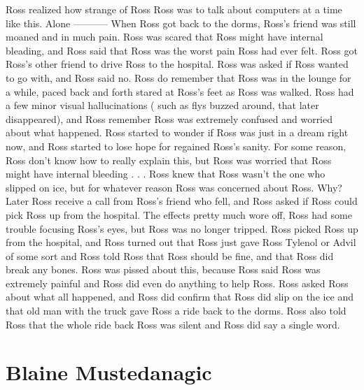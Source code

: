 \documentclass[12pt]{book}
\begin{document}
Ross realized how strange of Ross Ross was to talk about computers at a time like this. Alone ----------- When Ross got back to the dorms, Ross's friend was still moaned and in much pain. Ross was scared that Ross might have internal bleading, and Ross said that Ross was the worst pain Ross had ever felt. Ross got Ross's other friend to drive Ross to the hospital. Ross was asked if Ross wanted to go with, and Ross said no. Ross do remember that Ross was in the lounge for a while, paced back and forth stared at Ross's feet as Ross was walked. Ross had a few minor visual hallucinations ( such as flys buzzed around, that later disappeared), and Ross remember Ross was extremely confused and worried about what happened. Ross started to wonder if Ross was just in a dream right now, and Ross started to lose hope for regained Ross's sanity. For some reason, Ross don't know how to really explain this, but Ross was worried that Ross might have internal bleeding . . .  Ross knew that Ross wasn't the one who slipped on ice, but for whatever reason Ross was concerned about Ross. Why? Later Ross receive a call from Ross's friend who fell, and Ross asked if Ross could pick Ross up from the hospital. The effects pretty much wore off, Ross had some trouble focusing Ross's eyes, but Ross was no longer tripped. Ross picked Ross up from the hospital, and Ross turned out that Ross just gave Ross Tylenol or Advil of some sort and Ross told Ross that Ross should be fine, and that Ross did break any bones. Ross was pissed about this, because Ross said Ross was extremely painful and Ross did even do anything to help Ross. Ross asked Ross about what all happened, and Ross did confirm that Ross did slip on the ice and that old man with the truck gave Ross a ride back to the dorms. Ross also told Ross that the whole ride back Ross was silent and Ross did say a single word.



\chapter{Blaine Mustedanagic}
\end{document}
